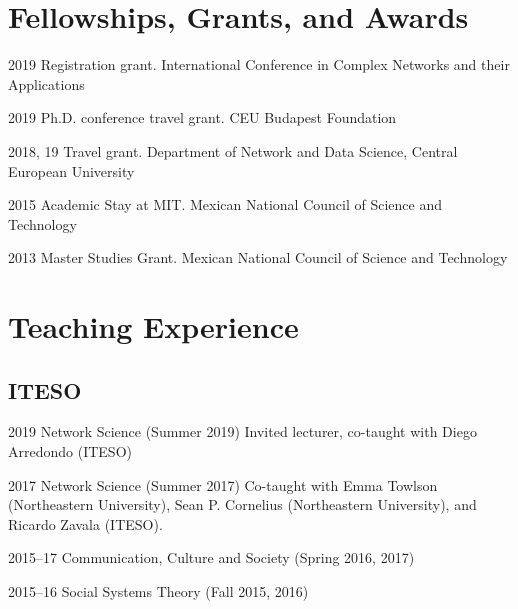 \documentclass{academiccv}
\begin{document}
\section*{Fellowships, Grants, and Awards}

\begin{tablist}

\item[2019] \tab Registration grant. International Conference in Complex Networks and their Applications

\item[2019] \tab Ph.D. conference travel grant. CEU Budapest Foundation

\item[2018, 19] \tab Travel grant. Department of Network and Data Science, Central European University

\item[2015] \tab Academic Stay at MIT. Mexican National Council of Science and Technology

\item[2013] \tab Master Studies Grant. Mexican National Council of Science and Technology

\end{tablist}



\section*{Teaching Experience}

\subsection*{ITESO}

\begin{tablist}
	\item[2019] \tab Network Science (Summer 2019) Invited lecturer, co-taught with Diego Arredondo (ITESO)

	\item[2017]	\tab Network Science (Summer 2017) Co-taught with Emma Towlson (Northeastern University), Sean P. Cornelius (Northeastern University), and Ricardo Zavala (ITESO).

	\item [2015--17]\tab Communication, Culture and Society (Spring 2016, 2017)

	\item [2015--16]\tab Social Systems Theory (Fall 2015, 2016)


\end{tablist}
\end{document}
